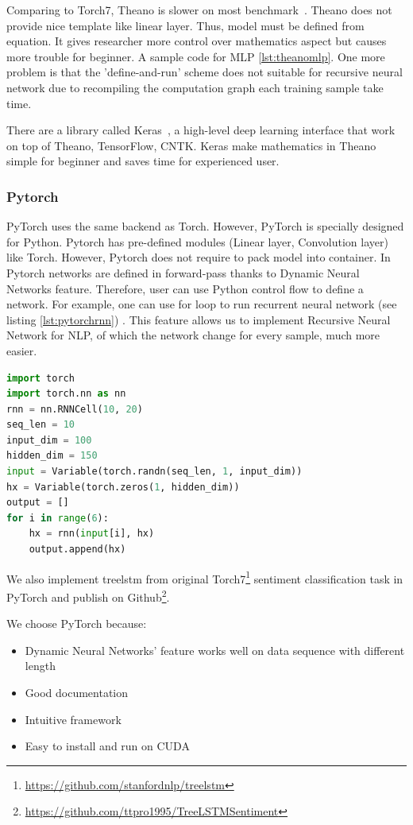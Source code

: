 Comparing to Torch7, Theano is slower on most benchmark~\cite{collobert2011torch7}. Theano does not provide nice template like linear layer. Thus, model must be defined from equation. It gives researcher more control over mathematics aspect but causes more trouble for beginner. A sample code for MLP \ref{lst:theanomlp}. One more problem is that the 'define-and-run' scheme does not suitable for recursive neural network due to recompiling the computation graph each training sample take time.

There are a library called Keras~\cite{chollet2017keras}, a high-level deep learning interface that work on top of Theano, TensorFlow, CNTK. Keras make mathematics in Theano simple for beginner and saves time for experienced user.

\subsubsection{Pytorch}\label{sec:pytorch}
PyTorch uses the same backend as Torch. However, PyTorch is specially designed for Python. Pytorch has pre-defined modules (Linear layer, Convolution layer) like Torch. However, Pytorch does not require to pack model into container. In Pytorch networks are defined in forward-pass thanks to Dynamic Neural Networks feature. Therefore, user can use Python control flow to define a network. For example, one can use for loop to run recurrent neural network (see listing \ref{lst:pytorchrnn}) .
This feature allows us to implement Recursive Neural Network for NLP, of which the network change for every sample, much more easier. 

\begin{lstlisting}[caption={RNN},label={lst:pytorchrnn}, language={python}]
import torch
import torch.nn as nn
rnn = nn.RNNCell(10, 20)
seq_len = 10
input_dim = 100
hidden_dim = 150
input = Variable(torch.randn(seq_len, 1, input_dim))
hx = Variable(torch.zeros(1, hidden_dim))
output = []
for i in range(6):
    hx = rnn(input[i], hx)
    output.append(hx)
\end{lstlisting}

We also implement treelstm from original Torch7\footnote{\url{https://github.com/stanfordnlp/treelstm}} sentiment classification task in PyTorch and publish on Github\footnote{\url{https://github.com/ttpro1995/TreeLSTMSentiment}}.

We choose PyTorch because:
\begin{itemize}
    \item Dynamic Neural Networks' feature works well on data sequence with different length
    \item Good documentation
    \item Intuitive framework
    \item Easy to install and run on CUDA
\end{itemize}
